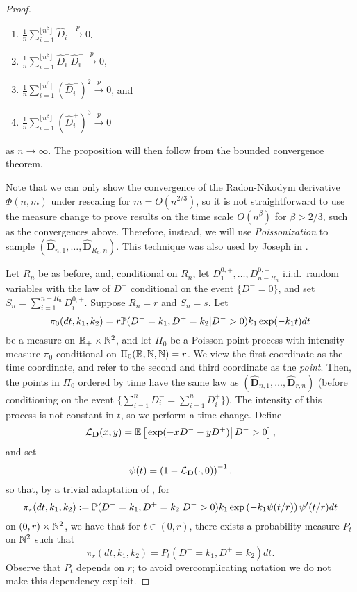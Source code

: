 \begin{proof}
\begin{enumerate}
    \item $\frac{1}{n}\sum_{i=1}^{\lfloor n^\beta \rfloor} \widehat{D}_i^-\overset{p}{\to}0 $, 
    \item $\frac{1}{n}\sum_{i=1}^{\lfloor n^\beta \rfloor}\widehat{D}_i^- \widehat{D}_i^+\overset{p}{\to}0$,
    \item $\frac{1}{n}\sum_{i=1}^{\lfloor n^\beta \rfloor}(\widehat{D}_i^-)^2\overset{p}{\to}0$, and 
    \item $\frac{1}{n}\sum_{i=1}^{\lfloor n^\beta \rfloor}(\widehat{D}_i^+)^3\overset{p}{\to}0$
\end{enumerate}
as $n\to \infty$. The proposition will then follow from the bounded convergence theorem.

Note that we can only show the convergence of the Radon-Nikodym derivative $\Phi(n,m)$ under rescaling for $m=O(n^{2/3})$, so it is not straightforward to use the measure change to prove results on the time scale $O(n^\beta)$ for $\beta>2/3$, such as the convergences above. Therefore, instead, we will use \emph{Poissonization} to sample $(\mathbf{\widehat{D}}_{n,1},\dots,\mathbf{\widehat{D}}_{R_n,n})$. This technique was also used by Joseph in \cite{josephComponentSizesCritical2014}. 

 Let $R_n$ be as before, and, conditional on $R_n$, let $D^{0,+}_1,\dots,D^{0,+}_{n-R_n}$ i.i.d.\ random variables with the law of $D^+$ conditional on the event $\{D^-=0\}$, and set $S_n=\sum_{i=1}^{n-R_n}D^{0,+}_i$. Suppose $R_n=r$ and $S_n=s$. 
Let
$$\pi_0(dt,k_1,k_2)=r\P(D^-=k_1,D^+=k_2|D^->0)k_1\exp(-k_1 t)dt$$
be a measure on $\R_+\times \N^2$, and let $\Pi_0$ be a Poisson point process with intensity measure $\pi_0$ conditional on $\Pi_0(\R,\N,\N)=r$. We view the first coordinate as the time coordinate, and refer to the second and third coordinate as the \emph{point}. Then, the points in $\Pi_0$ ordered by time have the same law as $(\mathbf{\widehat{D}}_{n,1},\dots,\mathbf{\widehat{D}}_{r,n})$ (before conditioning on the event $\{\sum_{i=1}^nD^-_i=\sum_{i=1}^nD^+_i\}$).  
The intensity of this process is not constant in $t$, so we perform a time change. Define
$$\cL_{\mathbf{D}}(x,y)=\E\left[\left.\exp(-xD^--yD^+)\right|D^->0 \right],$$
and set 
$$\psi(t)=\left(1-\cL_{\mathbf{D}}(\cdot,0)\right)^{-1},$$
so that, by a trivial adaptation of \cite[Lemma 4.1]{josephComponentSizesCritical2014}, for 
$$\pi_r(dt,k_1,k_2):=\P(D^-=k_1,D^+=k_2|D^->0)k_1\exp\left(-k_1 \psi(t/r)\right)\psi'(t/r)dt$$
on $(0,r)\times \N^2$, we have that for $t\in (0,r)$, there exists a probability measure $P_t$ on $\N^2$ such that
$$\pi_r(dt,k_1,k_2)=P_t(D^-=k_1,D^+=k_2)dt.$$
Observe that $P_t$ depends on $r$; to avoid overcomplicating notation we do not make this dependency explicit.


\end{proof}
